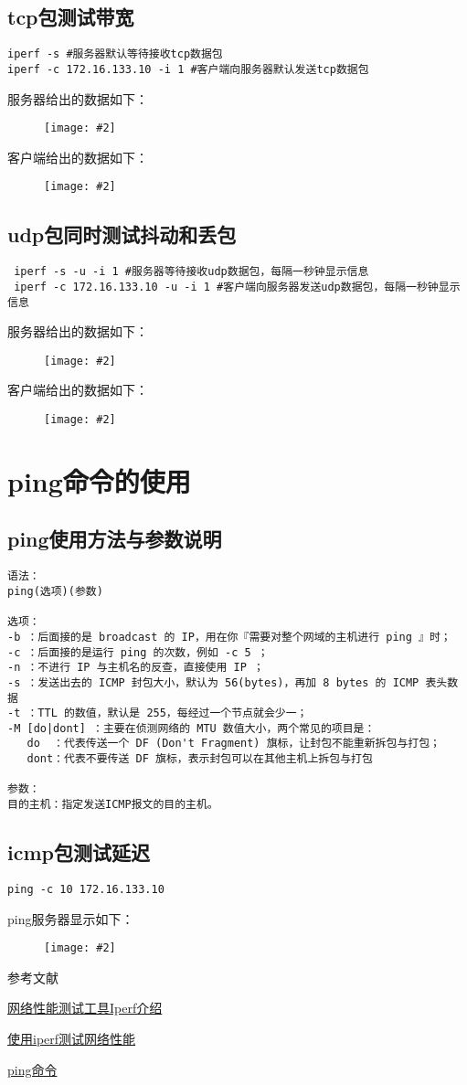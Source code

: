 \documentclass[a4paper,left=1.5cm,right=1.5cm,11pt]{article}
\newcommand{\sizedfic}[2]{\begin{figure}[H]
		\center
		\texttt{[image: \#2]}
	\end{figure}}
\def\hang{\hangindent\parindent}
\def\textindent#1{\indent\llap{#1\enspace}\ignorespaces}
\def\re{\par\hang\textindent}
\begin{document}
\subsection{tcp包测试带宽}
\begin{lstlisting}
iperf -s #服务器默认等待接收tcp数据包
iperf -c 172.16.133.10 -i 1 #客户端向服务器默认发送tcp数据包
\end{lstlisting}
服务器给出的数据如下：
\sizedfic{0.8}{iperf_tcp.png}
客户端给出的数据如下：
\sizedfic{0.8}{iperf_tcp2.png}
\subsection{udp包同时测试抖动和丢包}
\begin{lstlisting}
 iperf -s -u -i 1 #服务器等待接收udp数据包，每隔一秒钟显示信息
 iperf -c 172.16.133.10 -u -i 1 #客户端向服务器发送udp数据包，每隔一秒钟显示信息
\end{lstlisting}
服务器给出的数据如下：
\sizedfic{0.8}{iperf_udp1.png}
客户端给出的数据如下：
\sizedfic{0.8}{iperf_udp2.png}

\section{ping命令的使用}
\subsection{ping使用方法与参数说明}
\begin{lstlisting}
语法：
ping(选项)(参数)

选项：
-b ：后面接的是 broadcast 的 IP，用在你『需要对整个网域的主机进行 ping 』时；
-c ：后面接的是运行 ping 的次数，例如 -c 5 ；
-n ：不进行 IP 与主机名的反查，直接使用 IP ；
-s ：发送出去的 ICMP 封包大小，默认为 56(bytes)，再加 8 bytes 的 ICMP 表头数据
-t ：TTL 的数值，默认是 255，每经过一个节点就会少一；
-M [do|dont] ：主要在侦测网络的 MTU 数值大小，两个常见的项目是：
   do  ：代表传送一个 DF (Don't Fragment) 旗标，让封包不能重新拆包与打包；
   dont：代表不要传送 DF 旗标，表示封包可以在其他主机上拆包与打包

参数：
目的主机：指定发送ICMP报文的目的主机。
\end{lstlisting}
\subsection{icmp包测试延迟}
\begin{lstlisting}
ping -c 10 172.16.133.10
\end{lstlisting}
ping服务器显示如下：
\sizedfic{0.8}{ping1.png}
\clearpage
\begin{center}%
参考文献
\end{center}
\re{[1]} \href{http://www.sdnlab.com/2961.html}{网络性能测试工具Iperf介绍} 
\re{[2]} \href{http://www.51testing.com/html/11/255511-805117.html}{使用iperf测试网络性能}
\re{[3]} \href{http://man.linuxde.net/ping}{ping命令}
\end{document}
